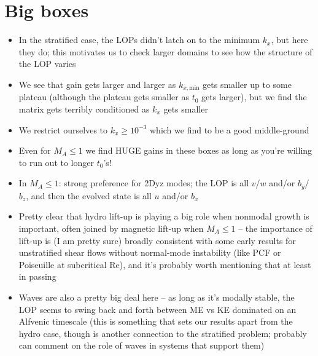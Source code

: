 \documentclass[%
 reprint,
 amsmath,amssymb,
 aps,
]{revtex4-2}
\begin{document}
\section{Big boxes}
    \begin{itemize}
        \item In the stratified case, the LOPs didn't latch on to the minimum $k_x$, but here they do; this motivates us to check larger domains to see how the structure of the LOP varies
        \item We see that gain gets larger and larger as $k_{x, \mathrm{min}}$ gets smaller up to some plateau (although the plateau gets smaller as $t_0$ gets larger), but we find the matrix gets terribly conditioned as $k_x$ gets smaller
        \item We restrict ourselves to $k_x \geq 10^{-3}$ which we find to be a good middle-ground
        \item Even for $M_A \leq 1$ we find HUGE gains in these boxes as long as you're willing to run out to longer $t_0$'s!
        \item In $M_A \leq 1$: strong preference for 2Dyz modes; the LOP is all $v$/$w$ and/or $b_y$/$b_z$, and then the evolved state is all $u$ and/or $b_x$
        \item Pretty clear that hydro lift-up is playing a big role when nonmodal growth is important, often joined by magnetic lift-up when $M_A \leq 1$ -- the importance of lift-up is (I am pretty sure) broadly consistent with some early results for unstratified shear flows without normal-mode instability (like PCF or Poiseuille at subcritical Re), and it's probably worth mentioning that at least in passing
        \item Waves are also a pretty big deal here -- as long as it's modally stable, the LOP seems to swing back and forth between ME vs KE dominated on an Alfvenic timescale (this is something that sets our results apart from the hydro case, though is another connection to the stratified problem; probably can comment on the role of waves in systems that support them)
    \end{itemize}
\end{document}
